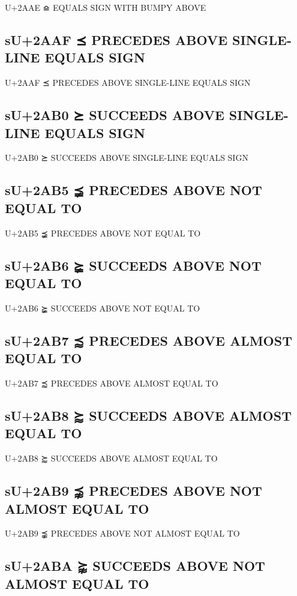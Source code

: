 U+2AAE ⪮ EQUALS SIGN WITH BUMPY ABOVE

\subsection{sU+2AAF ⪯ PRECEDES ABOVE SINGLE-LINE EQUALS SIGN}

U+2AAF ⪯ PRECEDES ABOVE SINGLE-LINE EQUALS SIGN

\subsection{sU+2AB0 ⪰ SUCCEEDS ABOVE SINGLE-LINE EQUALS SIGN}

U+2AB0 ⪰ SUCCEEDS ABOVE SINGLE-LINE EQUALS SIGN

\subsection{sU+2AB5 ⪵ PRECEDES ABOVE NOT EQUAL TO}

U+2AB5 ⪵ PRECEDES ABOVE NOT EQUAL TO

\subsection{sU+2AB6 ⪶ SUCCEEDS ABOVE NOT EQUAL TO}

U+2AB6 ⪶ SUCCEEDS ABOVE NOT EQUAL TO

\subsection{sU+2AB7 ⪷ PRECEDES ABOVE ALMOST EQUAL TO}

U+2AB7 ⪷ PRECEDES ABOVE ALMOST EQUAL TO

\subsection{sU+2AB8 ⪸ SUCCEEDS ABOVE ALMOST EQUAL TO}

U+2AB8 ⪸ SUCCEEDS ABOVE ALMOST EQUAL TO

\subsection{sU+2AB9 ⪹ PRECEDES ABOVE NOT ALMOST EQUAL TO}

U+2AB9 ⪹ PRECEDES ABOVE NOT ALMOST EQUAL TO

\subsection{sU+2ABA ⪺ SUCCEEDS ABOVE NOT ALMOST EQUAL TO}

